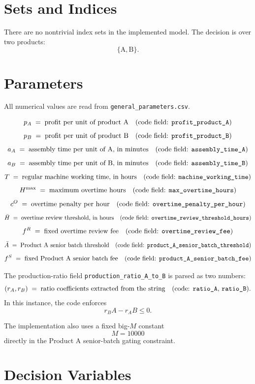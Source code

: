\section*{Sets and Indices}

There are no nontrivial index sets in the implemented model. The decision is over two products:
\[
\{\mathrm{A},\mathrm{B}\}.
\]

\section*{Parameters}

All numerical values are read from \texttt{general\_parameters.csv}.

\[
p_A \;=\; \text{profit per unit of product A}
\quad\text{(code field: \texttt{profit\_product\_A})}
\]
\[
p_B \;=\; \text{profit per unit of product B}
\quad\text{(code field: \texttt{profit\_product\_B})}
\]
\[
a_A \;=\; \text{assembly time per unit of A, in minutes}
\quad\text{(code field: \texttt{assembly\_time\_A})}
\]
\[
a_B \;=\; \text{assembly time per unit of B, in minutes}
\quad\text{(code field: \texttt{assembly\_time\_B})}
\]
\[
T \;=\; \text{regular machine working time, in hours}
\quad\text{(code field: \texttt{machine\_working\_time})}
\]
\[
H^{\max} \;=\; \text{maximum overtime hours}
\quad\text{(code field: \texttt{max\_overtime\_hours})}
\]
\[
c^O \;=\; \text{overtime penalty per hour}
\quad\text{(code field: \texttt{overtime\_penalty\_per\_hour})}
\]
\[
\bar H \;=\; \text{overtime review threshold, in hours}
\quad\text{(code field: \texttt{overtime\_review\_threshold\_hours})}
\]
\[
f^R \;=\; \text{fixed overtime review fee}
\quad\text{(code field: \texttt{overtime\_review\_fee})}
\]
\[
\bar A \;=\; \text{Product A senior batch threshold}
\quad\text{(code field: \texttt{product\_A\_senior\_batch\_threshold})}
\]
\[
f^S \;=\; \text{fixed Product A senior batch fee}
\quad\text{(code field: \texttt{product\_A\_senior\_batch\_fee})}
\]

The production-ratio field \texttt{production\_ratio\_A\_to\_B} is parsed as two numbers:
\[
(r_A,r_B) \;=\; \text{ratio coefficients extracted from the string}
\quad\text{(code: \texttt{ratio\_A}, \texttt{ratio\_B})}.
\]
In this instance, the code enforces
\[
r_B A - r_A B \le 0.
\]

The implementation also uses a fixed big-\(M\) constant
\[
M = 10000
\]
directly in the Product A senior-batch gating constraint.

\section*{Decision Variables}

